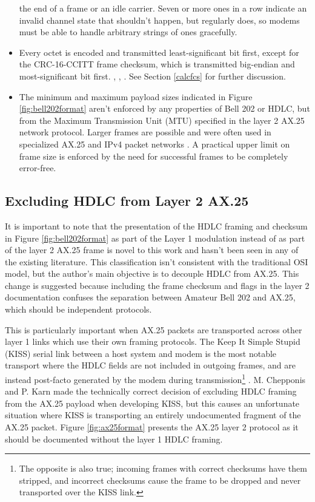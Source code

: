 \begin{itemize}
{			the end of a frame or an idle carrier.
			Seven or more ones in a row indicate an invalid channel state
			that shouldn't happen, but regularly does, so modems must be 
			able to handle arbitrary strings of ones gracefully.}
	\item Every octet is encoded and transmitted least-significant bit first,
		except for the CRC-16-CCITT frame checksum, 
		which is transmitted big-endian
		and most-significant bit first.
		\cite[\S3.8]{ax25spec},
		\cite[\S8.1.1-2]{ituv42},
		\cite{n1vgphy}.
		See Section \ref{calcfcs} for further discussion.
	\item The minimum and maximum payload sizes indicated in Figure 
		\ref{fig:bell202format} aren't enforced by any properties of 
		Bell 202 or HDLC, but from the Maximum Transmission Unit (MTU)
		specified in the layer 2 AX.25 network protocol.
		Larger frames are possible and were often used in specialized 
		AX.25 and IPv4 packet networks \cite{pattersoninterview}.
		A practical upper limit on frame size is enforced by
		the need for successful frames to be completely error-free.


\end{itemize}

\subsection{Excluding HDLC from Layer 2 AX.25}

It is important to note that the presentation of the HDLC framing
and checksum
in Figure \ref{fig:bell202format} as part of the Layer 1 modulation 
instead of as part of the layer 2 AX.25 frame is 
novel to this work and hasn't been seen in any of the existing literature.
This classification isn't consistent with the traditional OSI model,
but the author's main objective is to decouple HDLC from AX.25.
This change is suggested because including the frame checksum and flags
in the layer 2 documentation confuses the separation between Amateur Bell 202 
and AX.25, which should be independent protocols.

This is particularly important when AX.25 packets are transported across 
other layer 1 links which use their own framing protocols.
The Keep It Simple Stupid (KISS) serial link between 
a host system and modem is the most notable
transport where the HDLC fields are not included in outgoing frames, 
and are instead 
post-facto generated by the modem during transmission\footnote{The opposite
	is also true; incoming frames with correct checksums have them stripped,
	and incorrect checksums cause the frame to be dropped and never
transported over the KISS link.} \cite{KISSspec}.
M. Chepponis and P. Karn made the technically correct decision of excluding 
HDLC framing from the AX.25 payload when developing KISS, but this causes
an unfortunate situation where KISS is transporting an entirely
undocumented fragment of the AX.25 packet. Figure \ref{fig:ax25format} 
presents the AX.25 layer 2 protocol as it should be documented without
the layer 1 HDLC framing.

